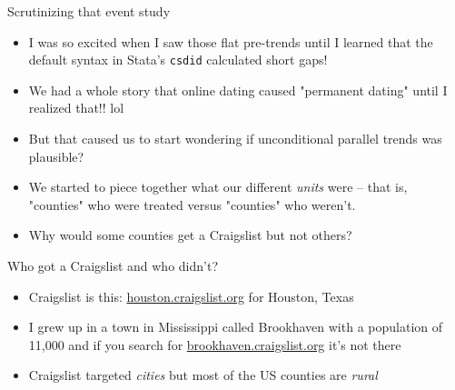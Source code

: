 \documentclass{beamer}
\begin{document}
\begin{frame}{Scrutinizing that event study}

\begin{itemize}
\item I was so excited when I saw those flat pre-trends until I learned that the default syntax in Stata's \texttt{csdid} calculated short gaps!
\item We had a whole story that online dating caused "permanent dating" until I realized that!! lol
\item But that caused us to start wondering if unconditional parallel trends was plausible?
\item We started to piece together what our different \emph{units} were -- that is, "counties" who were treated versus "counties" who weren't.  
\item Why would some counties get a Craigslist but not others?  
\end{itemize}
\end{frame}



\begin{frame}{Who got a Craigslist and who didn't?}

\begin{itemize}

\item Craigslist is this: \url{houston.craigslist.org} for Houston, Texas
\item I grew up in a town in Mississippi called Brookhaven with a population of 11,000 and if you search for \url{brookhaven.craigslist.org} it's not there
\item Craigslist targeted \emph{cities} but most of the US counties are \emph{rural}
\end{itemize}

\end{frame}
\end{document}
